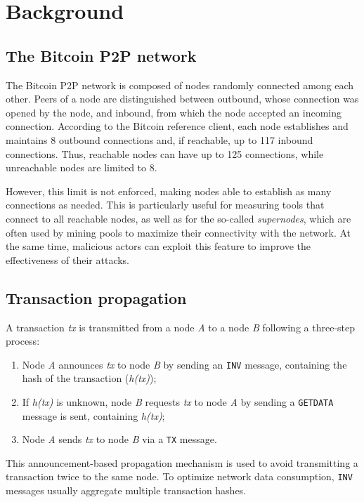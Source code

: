 \documentclass{article}
\begin{document}
	
	\section{Background}
	\label{sec:spreading}
	
	\subsection{The Bitcoin P2P network}
	The Bitcoin P2P network is composed of nodes randomly connected among each other.
	Peers of a node are distinguished between outbound, whose connection was opened by the node, and inbound, from which the node accepted an incoming connection.
	According to the Bitcoin reference client, each node establishes and maintains 8 outbound connections and, if reachable, up to 117 inbound connections.
	Thus, reachable nodes can have up to 125 connections, while unreachable nodes are limited to 8.
	
	However, this limit is not enforced, making nodes able to establish as many connections as needed.
	This is particularly useful for measuring tools that connect to all reachable nodes, as well as for the so-called \textit{supernodes}, which are often used by mining pools to maximize their connectivity with the network.
	At the same time, malicious actors can exploit this feature to improve the effectiveness of their attacks.
	
	\subsection{Transaction propagation}
	\label{sec:txprop}
	A transaction \textit{tx} is transmitted from a node \textit{A} to a node \textit{B} following a three-step process:
	\begin{enumerate}
		\item Node \textit{A} announces \textit{tx} to node \textit{B} by sending an \texttt{INV} message, containing the hash of the transaction (\textit{h(tx)});
		\item If \textit{h(tx)} is unknown, node \textit{B} requests \textit{tx} to node \textit{A} by sending a \texttt{GETDATA} message is sent, containing \textit{h(tx)};
		\item Node \textit{A} sends \textit{tx} to node \textit{B} via a \texttt{TX} message.
	\end{enumerate}
	This announcement-based propagation mechanism is used to avoid transmitting a transaction twice to the same node.
	To optimize network data consumption, \texttt{INV} messages usually aggregate multiple transaction hashes.
	
\end{document}
